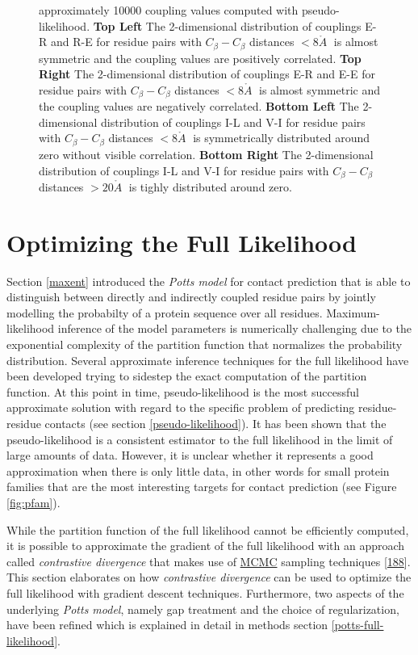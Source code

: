 \documentclass[11pt,a4paper,twoside]{book}
\newcommand{\Cb}{C_\beta}
\newcommand{\angstrom}{\mathring{A} \;}
\theoremstyle{definition}
\theoremstyle{definition}
\theoremstyle{remark}
\begin{document}
\begin{figure}
{approximately 10000 coupling values computed with pseudo-likelihood.
\textbf{Top Left} The 2-dimensional distribution of couplings E-R and
R-E for residue pairs with \(\Cb-\Cb\) distances \(< 8 \angstrom\) is
almost symmetric and the coupling values are positively correlated.
\textbf{Top Right} The 2-dimensional distribution of couplings E-R and
E-E for residue pairs with \(\Cb-\Cb\) distances \(< 8 \angstrom\) is
almost symmetric and the coupling values are negatively correlated.
\textbf{Bottom Left} The 2-dimensional distribution of couplings I-L and
V-I for residue pairs with \(\Cb-\Cb\) distances \(< 8 \angstrom\) is
symmetrically distributed around zero without visible correlation.
\textbf{Bottom Right} The 2-dimensional distribution of couplings I-L
and V-I for residue pairs with \(\Cb-\Cb\) distances \(> 20 \angstrom\)
is tighly distributed around zero.}\label{fig:2d-coupling-profiles-0-8}
\end{figure}

\chapter{Optimizing the Full
Likelihood}\label{optimizing-full-likelihood}

Section \ref{maxent} introduced the \emph{Potts model} for contact
prediction that is able to distinguish between directly and indirectly
coupled residue pairs by jointly modelling the probabilty of a protein
sequence over all residues. Maximum-likelihood inference of the model
parameters is numerically challenging due to the exponential complexity
of the partition function that normalizes the probability distribution.
Several approximate inference techniques for the full likelihood have
been developed trying to sidestep the exact computation of the partition
function. At this point in time, pseudo-likelihood is the most
successful approximate solution with regard to the specific problem of
predicting residue-residue contacts (see section
\ref{pseudo-likelihood}). It has been shown that the pseudo-likelihood
is a consistent estimator to the full likelihood in the limit of large
amounts of data. However, it is unclear whether it represents a good
approximation when there is only little data, in other words for small
protein families that are the most interesting targets for contact
prediction (see Figure \ref{fig:pfam}).

While the partition function of the full likelihood cannot be
efficiently computed, it is possible to approximate the gradient of the
full likelihood with an approach called \emph{contrastive divergence}
that makes use of \protect\hyperlink{abbrev}{MCMC} sampling techniques
{[}\protect\hyperlink{ref-Hinton2002}{188}{]}. This section elaborates
on how \emph{contrastive divergence} can be used to optimize the full
likelihood with gradient descent techniques. Furthermore, two aspects of
the underlying \emph{Potts model}, namely gap treatment and the choice
of regularization, have been refined which is explained in detail in
methods section \ref{potts-full-likelihood}.
\end{document}
